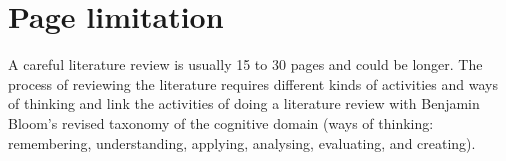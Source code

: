 \section {Page limitation}
A careful literature review is usually 15 to 30 pages and could be longer. The process of reviewing the literature requires different kinds of activities and ways of thinking and link the activities of doing a literature review with Benjamin Bloom’s revised taxonomy of the cognitive domain (ways of thinking: remembering, understanding, applying, analysing, evaluating, and creating).
